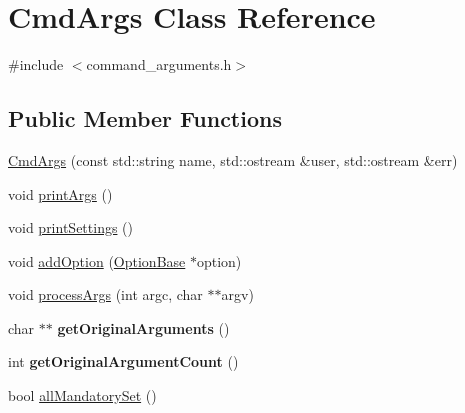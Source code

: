 \hypertarget{class_cmd_args}{}\section{Cmd\+Args Class Reference}
\label{class_cmd_args}


{\ttfamily \#include $<$command\+\_\+arguments.\+h$>$}

\subsection*{Public Member Functions}
\begin{DoxyCompactItemize}
\item 
\hyperlink{class_cmd_args_a214efd9198eb8124a08e80cda9f0e253}{Cmd\+Args} (const std\+::string name, std\+::ostream \&user, std\+::ostream \&err)
\item 
void \hyperlink{class_cmd_args_aecdd9be22130abe064fb46a6ebc40c41}{print\+Args} ()
\item 
void \hyperlink{class_cmd_args_a1ac48d7334790086d8fb55e86d8cdd6e}{print\+Settings} ()
\item 
void \hyperlink{class_cmd_args_a58a223305551991a3b9f3a38d386295d}{add\+Option} (\hyperlink{class_option_base}{Option\+Base} $\ast$option)
\item 
void \hyperlink{class_cmd_args_a91066e5757db5cee24b244a736365939}{process\+Args} (int argc, char $\ast$$\ast$argv)
\item 
\hypertarget{class_cmd_args_a173bac3022d199a2973d76e9c93e4c88}{}\label{class_cmd_args_a173bac3022d199a2973d76e9c93e4c88} 
char $\ast$$\ast$ {\bfseries get\+Original\+Arguments} ()
\item 
\hypertarget{class_cmd_args_a7d53af33026586a5d0017297485f3aff}{}\label{class_cmd_args_a7d53af33026586a5d0017297485f3aff} 
int {\bfseries get\+Original\+Argument\+Count} ()
\item 
bool \hyperlink{class_cmd_args_af8460dc8b1ec7eb745d256f6e80afc2e}{all\+Mandatory\+Set} ()
\end{DoxyCompactItemize}


